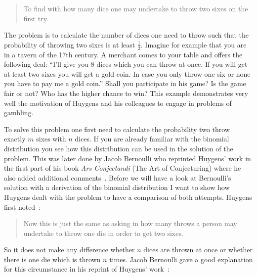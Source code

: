 \begin{quotation}
  To find with how many dice one may undertake to throw two sixes on the first try.
\end{quotation}


The problem is to calculate the number of dices one need to throw such that the probability of throwing two sixes is at least $\tfrac 12$. Imagine for example that you are in a tavern of the 17th century. A merchant comes to your table and offers the following deal: ``I'll give you $8$ dices which you can throw at once. If you will get at least two sixes you will get a gold coin. In case you only throw one six or none you have to pay me a gold coin.'' Shall you participate in his game? Is the game fair or not? Who has the higher chance to win? This example demonstrates very well the motivation of Huygens and his colleagues to engage in problems of gambling.

To solve this problem one first need to calculate the probability two throw exactly $m$ sixes with $n$ dices. If you are already familiar with the binomial distribution you see how this distribution can be used in the solution of the problem. This was later done by Jacob Bernoulli who reprinted Huygens' work in the first part of his book \emph{Ars Conjectandi} (The Art of Conjecturing) where he also added additional comments~\cite[p. 63]{bernoulli}. Before we will have a look at Bernoulli's solution with a derivation of the binomial distribution I want to show how Huygens dealt with the problem to have a comparison of both attempts. Huygens first noted~\cite[p. 163]{bernoulli}:

\begin{quotation}
  Now this is just the same as asking in how many throws a person may undertake to throw one die in order to get two sixes.
\end{quotation}

So it does not make any difference whether $n$ dices are thrown at once or whether there is one die which is thrown $n$ times. Jacob Bernoulli gave a good explanation for this circumstance in his reprint of Huygens' work~\cite[p. 163]{bernoulli}:

